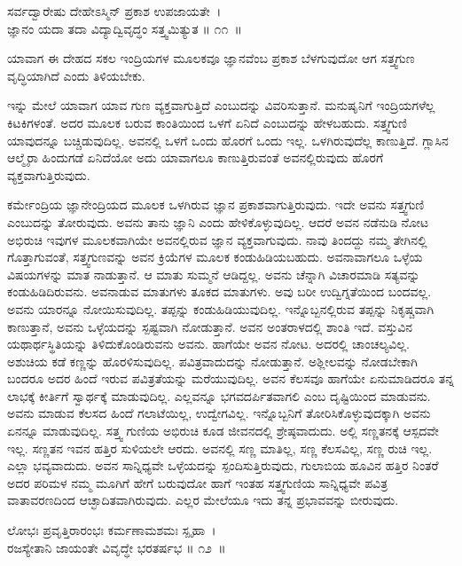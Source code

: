 \begin{shloka}
ಸರ್ವದ್ವಾರೇಷು ದೇಹೇಽಸ್ಮಿನ್ ಪ್ರಕಾಶ ಉಪಜಾಯತೇ~।\\ಜ್ಞಾನಂ ಯದಾ ತದಾ ವಿದ್ಯಾದ್ವಿವೃದ್ಧಂ ಸತ್ತ್ವಮಿತ್ಯುತ \hfill॥ ೧೧~॥
\end{shloka}

\begin{artha}
ಯಾವಾಗ ಈ ದೇಹದ ಸಕಲ ಇಂದ್ರಿಯಗಳ ಮೂಲಕವೂ ಜ್ಞಾನವೆಂಬ ಪ್ರಕಾಶ ಬೆಳಗುವುದೋ ಆಗ ಸತ್ತ್ವಗುಣ ವೃದ್ಧಿಯಾಗಿದೆ ಎಂದು ತಿಳಿಯಬೇಕು.
\end{artha}

ಇನ್ನು ಮೇಲೆ ಯಾವಾಗ ಯಾವ ಗುಣ ವ್ಯಕ್ತವಾಗುತ್ತಿದೆ ಎಂಬುದನ್ನು ವಿವರಿಸುತ್ತಾನೆ. ಮನುಷೃನಿಗೆ ಇಂದ್ರಿಯಗಳೆಲ್ಲ ಕಿಟಕಿಗಳಂತೆ. ಅದರ ಮೂಲಕ ಬರುವ ಕಾಂತಿಯಿಂದ ಒಳಗೆ ಏನಿದೆ ಎಂಬುದನ್ನು ಹೇಳಬಹುದು. ಸತ್ತ್ವಗುಣಿ ಯಾವುದನ್ನೂ ಬಚ್ಚಿಡುವುದಿಲ್ಲ. ಅವನಲ್ಲಿ ಒಳಗೆ ಒಂದು ಹೊರಗೆ ಒಂದು ಇಲ್ಲ. ಒಳಗಿರುವುದೆಲ್ಲ ಕಾಣುತ್ತಿದೆ. ಗ್ಲಾಸಿನ ಆಲ್ಮೈರಾ ಹಿಂದುಗಡೆ ಏನಿದೆಯೋ ಅದು ಯಾವಾಗಲೂ ಕಾಣುತ್ತಿರುವಂತೆ ಅವನಲ್ಲಿರುವುದು ಹೊರಗೆ ವ್ಯಕ್ತವಾಗುತ್ತಿರುವುದು.

ಕರ್ಮೇಂದ್ರಿಯ ಜ್ಞಾನೇಂದ್ರಿಯದ ಮೂಲಕ ಒಳಗಿರುವ ಜ್ಞಾನ ಪ್ರಕಾಶವಾಗುತ್ತಿರುವುದು. ಇದೇ ಅವನು ಸತ್ತ್ವಗುಣಿ ಎಂಬುದನ್ನು ತೋರುವುದು. ಅವನು ತಾನು ಜ್ಞಾನಿ ಎಂದು ಹೇಳಿಕೊಳ್ಳುವುದಿಲ್ಲ. ಆದರೆ ಅವನ ನಡೆನುಡಿ ನೋಟ ಅಭಿರುಚಿ ಇವುಗಳ ಮೂಲಕವಾಗಿಯೇ ಅವನಲ್ಲಿರುವ ಜ್ಞಾನ ವ್ಯಕ್ತವಾಗುವುದು. ನಾವು ತಿಂದದ್ದು ನಮ್ಮ ತೇಗಿನಲ್ಲಿ ಗೊತ್ತಾಗುವಂತೆ, ಸತ್ತ್ವಗುಣವನ್ನು ಅವನ ಕ್ರಿಯೆಗಳ ಮೂಲಕ ಕಂಡುಹಿಡಿಯಬಹುದು. ಅವನಾವಾಗಲೂ ಒಳ್ಳೆಯ ವಿಷಯಗಳನ್ನು ಮಾತ ನಾಡುತ್ತಾನೆ. ಆ ಮಾತು ಸುಮ್ಮನೆ ಆಡಿದ್ದಲ್ಲ. ಅವನು ಚೆನ್ನಾಗಿ ವಿಚಾರಮಾಡಿ ಸತ್ಯವನ್ನು ಕಂಡುಹಿಡಿದಿರುವನು. ಅವನಾಡುವ ಮಾತುಗಳು ತೂಕದ ಮಾತುಗಳು. ಅವು ಬರೀ ಉದ್ವಿಗ್ನತೆಯಿಂದ ಬಂದವಲ್ಲ. ಅವನು ಯಾರನ್ನೂ ನೋಯಿಸುವುದಿಲ್ಲ. ತಪ್ಪನ್ನು ಕಂಡುಹಿಡಿಯುವುದಿಲ್ಲ. ಇನ್ನೊಬ್ಬನಲ್ಲಿರುವ ತಪ್ಪನ್ನು ನಿಕೃಷ್ಚವಾಗಿ ಕಾಣುತ್ತಾನೆ, ಅವನು ಒಳ್ಳೆಯದನ್ನು ಸ್ಪಷ್ಟವಾಗಿ ನೋಡುತ್ತಾನೆ. ಅವನ ಅಂತರಾಳದಲ್ಲಿ ಶಾಂತಿ ಇದೆ. ವಸ್ತುವಿನ ಯಥಾರ್ಥಸ್ಥಿತಿಯನ್ನು ತಿಳಿದುಕೊಂಡಿರುವನು ಅವನು. ಹಾಗೆಯೇ ಅವನ ನೋಟ. ಅದರಲ್ಲಿ ಚಾಂಚಲ್ಯವಿಲ್ಲ. ಅಶುಚಿಯ ಕಡೆ ಕಣ್ಣನ್ನು ಹೊರಳಿಸುವುದಿಲ್ಲ. ಪವಿತ್ರವಾದುದನ್ನು ನೋಡುತ್ತಾನೆ. ಅಶ್ಲೀಲವನ್ನು ನೋಡಬೇಕಾಗಿ ಬಂದರೂ ಅದರ ಹಿಂದೆ ಇರುವ ಪವಿತ್ರತೆಯನ್ನು ಮರೆಯುವುದಿಲ್ಲ. ಅವನ ಕೆಲಸವೂ ಹಾಗೆಯೇ ಏನುಮಾಡಿದರೂ ತನ್ನ ಲಾಭಕ್ಕೆ ಕೀರ್ತಿಗೆ ಸ್ವಾರ್ಥಕ್ಕೆ ಮಾಡುವುದಿಲ್ಲ. ಎಲ್ಲವನ್ನೂ ಭಗವದರ್ಪಿತವಾಗಲಿ ಎಂಬ ದೃಷ್ಟಿಯಿಂದ ಮಾಡುವನು. ಅವನು ಮಾಡುವ ಕೆಲಸದ ಹಿಂದೆ ಗಲಾಟೆಯಿಲ್ಲ, ಉದ್ವೇಗವಿಲ್ಲ. ಇನ್ನೊಬ್ಬನಿಗೆ ತೋರಿಸಿಕೊಳ್ಳುವುದಕ್ಕಾಗಿ ಅವನು ಏನನ್ನೂ ಮಾಡುವುದಿಲ್ಲ. ಸತ್ತ್ವ ಗುಣಿಯ ಅಭಿರುಚಿ ಕೂಡ ಜೀವನದಲ್ಲಿ ಶ್ರೇಷ್ಠವಾದುದು. ಅಲ್ಲಿ ಸಣ್ಣತನಕ್ಕೆ ಆಸ್ಪದವೇ ಇಲ್ಲ. ಸಣ್ಣತನ ಇವನ ಹತ್ತಿರ ಸುಳಿಯಲೇ ಆರದು. ಅವನಲ್ಲಿ ಸಣ್ಣ ಮಾತಿಲ್ಲ, ಸಣ್ಣ ಕೆಲಸವಿಲ್ಲ, ಸಣ್ಣ ರುಚಿ ಇಲ್ಲ. ಎಲ್ಲಾ ಭವ್ಯವಾದುದು. ಅವನ ಸಾನ್ನಿಧ್ಯವೇ ಒಳ್ಳೆಯದನ್ನು ಸ್ಪಂದಿಸುತ್ತಿರುವುದು, ಗುಲಾಬಿಯ ಹೂವಿನ ಹತ್ತಿರ ನಿಂತರೆ ಅದರ ಪರಿಮಳ ನಮ್ಮ ಮೂಗಿಗೆ ಹೇಗೆ ಬರುವುದೋ ಹಾಗೆ ಇಂತಹ ಸತ್ತ್ವಗುಣಿಯ ಸಾನ್ನಿಧ್ಯವೇ ಪವಿತ್ರ ವಾತಾವರಣದಿಂದ ಆಚ್ಛಾದಿತವಾಗಿರುವುದು. ಎಲ್ಲರ ಮೇಲೆಯೂ ಇದು ತನ್ನ ಪ್ರಭಾವವನ್ನು ಬೀರುವುದು.

\begin{shloka}
ಲೋಭಃ ಪ್ರವೃತ್ತಿರಾರಂಭಃ ಕರ್ಮಣಾಮಶಮಃ ಸ್ಪೃಹಾ~।\\ರಜಸ್ಯೇತಾನಿ ಜಾಯಂತೇ ವಿವೃದ್ಧೇ ಭರತರ್ಷಭ \hfill॥ ೧೨~॥
\end{shloka}

